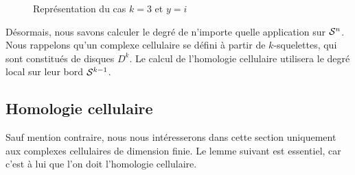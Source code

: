 \begin{figure}[H]
\centering
{}
\caption{Représentation du cas $k=3$ et $y=i$}
\label{fig:deg-loc-circle}
\end{figure}

Désormais, nous savons calculer le degré de n'importe quelle application sur $\mathcal{S}^{n}$. Nous rappelons qu'un complexe cellulaire se défini à partir de $k$-squelettes, qui sont constitués de disques $D^k$. Le calcul de l'homologie cellulaire utilisera le degré local sur leur bord $\mathcal{S}^{k-1}$.

\subsection{Homologie cellulaire}

Sauf mention contraire, nous nous intéresserons dans cette section uniquement aux complexes cellulaires de dimension finie. Le lemme suivant est essentiel, car c'est à lui que l'on doit l'homologie cellulaire.


